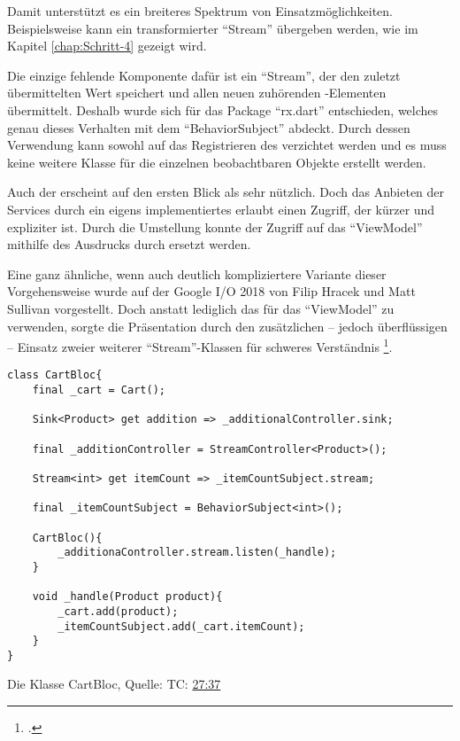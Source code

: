 Damit unterstützt es ein breiteres Spektrum von Einsatzmöglichkeiten.
Beispielsweise kann ein transformierter \enquote{Stream} übergeben werden, wie im Kapitel \ref{chap:Schritt-4} gezeigt wird.

Die einzige fehlende Komponente dafür ist ein \enquote{Stream},
der den zuletzt übermittelten Wert speichert und allen neuen zuhörenden -Elementen übermittelt.
Deshalb wurde sich für das Package \enquote{rx.dart} entschieden,
welches genau dieses Verhalten mit dem \enquote{BehaviorSubject} abdeckt.
Durch dessen Verwendung kann sowohl auf das Registrieren des  verzichtet werden
und es muss keine weitere Klasse für die einzelnen beobachtbaren Objekte erstellt werden.

Auch der  erscheint auf den ersten Blick als sehr nützlich.
Doch das Anbieten der Services durch ein eigens implementiertes  erlaubt einen Zugriff,
der kürzer und expliziter ist.
Durch die Umstellung konnte der Zugriff auf das \enquote{ViewModel} mithilfe des Ausdrucks  durch  ersetzt werden.

Eine ganz ähnliche, wenn auch deutlich kompliziertere Variante dieser Vorgehensweise wurde auf der Google I/O 2018 von Filip Hracek und Matt Sullivan vorgestellt.
Doch anstatt lediglich das  für das \enquote{ViewModel} zu verwenden,
sorgte die Präsentation durch den zusätzlichen -- jedoch überflüssigen -- Einsatz zweier weiterer \enquote{Stream}-Klassen für schweres Verständnis \Lst{\ref{lst:CartBloc}}\footcite[][TC: \href{https://youtu.be/RS36gBEp8OI?t=1657}{27:37}]{GoogleIO18}.

\ifIncludeFigures
  \begin{listing}[h]
    \begin{verbatim}
class CartBloc{
    final _cart = Cart();

    Sink<Product> get addition => _additionalController.sink;

    final _additionController = StreamController<Product>();

    Stream<int> get itemCount => _itemCountSubject.stream;

    final _itemCountSubject = BehaviorSubject<int>();

    CartBloc(){
        _additionaController.stream.listen(_handle);
    }

    void _handle(Product product){
        _cart.add(product);
        _itemCountSubject.add(_cart.itemCount);
    }
}
\end{verbatim}
    \caption[Die Klasse CartBloc]{Die Klasse CartBloc, Quelle: \cite{GoogleIO18} TC: \href{https://youtu.be/RS36gBEp8OI?t=1657}{27:37}}
    \label{lst:CartBloc}
  \end{listing}
\fi

